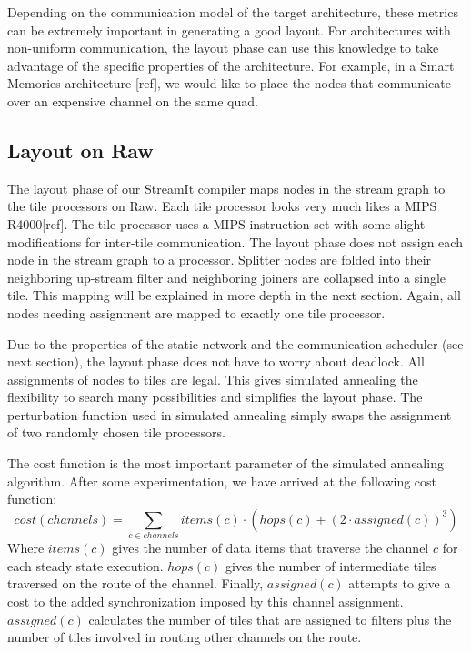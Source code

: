 Depending on the communication model of the target architecture, these
metrics can be extremely important in generating a good layout.  For
architectures with non-uniform communication, the layout phase can use
this knowledge to take advantage of the specific properties of the
architecture.  For example, in a Smart Memories architecture [ref], we
would like to place the nodes that communicate over an expensive
channel on the same quad.

\subsection{Layout on Raw}

The layout phase of our StreamIt compiler maps nodes in the stream
graph to the tile processors on Raw.  Each tile processor looks very
much likes a MIPS R4000[ref].  The tile processor uses a MIPS
instruction set with some slight modifications for inter-tile
communication.  The layout phase does not assign each node in the
stream graph to a processor.  Splitter nodes are folded into their
neighboring up-stream filter and neighboring joiners are collapsed
into a single tile.  This mapping will be explained in more depth in
the next section.  Again, all nodes needing assignment are mapped to
exactly one tile processor.

Due to the properties of the static network and the communication
scheduler (see next section), the layout phase does not have to worry
about deadlock.  All assignments of nodes to tiles are legal.  This
gives simulated annealing the flexibility to search many possibilities
and simplifies the layout phase.  The perturbation function used in
simulated annealing simply swaps the assignment of two randomly chosen
tile processors.

The cost function is the most important parameter of the simulated
annealing algorithm.  After some experimentation, we have arrived at
the following cost function: 
\[
cost(channels) = \sum _{c \in channels} items(c) \cdot \left( hops(c) + \left( 2 \cdot
assigned(c) \right) ^{3} \right)
\]
Where \(items(c)\) gives the number of data items that traverse the
channel \(c\) for each steady state execution.  \(hops(c)\) gives the
number of intermediate tiles traversed on the route of the channel.
Finally, \(assigned(c)\) attempts to give a cost to the added
synchronization imposed by this channel assignment.  \(assigned(c)\)
calculates the number of tiles that are assigned to filters plus the
number of tiles involved in routing other channels on the route.

